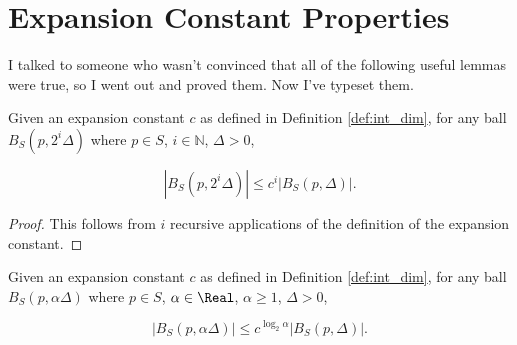 \section{Expansion Constant Properties}

I talked to someone who wasn't convinced that all of the following useful lemmas
were true, so I went out and proved them.  Now I've typeset them.

\begin{lemma}
\label{lem:ec_rec}
Given an expansion constant $c$ as defined in Definition \ref{def:int_dim}, for any
ball $B_S(p, 2^i \Delta)$ where $p \in S$, $i \in \mathbb{N}$, $\Delta > 0$,

\begin{equation}
| B_S(p, 2^i \Delta) | \le c^i | B_S(p, \Delta) |.
\end{equation}
\end{lemma}

\begin{proof}
This follows from $i$ recursive applications of the definition of the expansion
constant.
\end{proof}

\begin{lemma}
\label{lem:ec_re}
Given an expansion constant $c$ as defined in Definition \ref{def:int_dim}, for any
ball $B_S(p, \alpha \Delta)$ where $p \in S$, $\alpha \in \Real$, $\alpha \ge 1$,
$\Delta > 0$,

\begin{equation}
| B_S(p, \alpha \Delta) | \le c^{\log_2 \alpha} | B_S(p, \Delta) |.
\end{equation}
\end{lemma}

